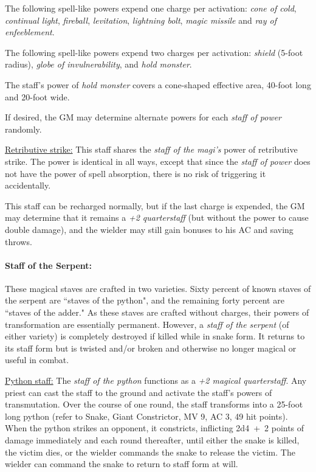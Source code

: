 \begin{multicols}{2}
The following spell-like powers expend one charge per activation: \textit{cone of cold}, \textit{continual light}, \textit{fireball}, \textit{levitation}, \textit{lightning bolt}, \textit{magic missile} and \textit{ray of enfeeblement}.

The following spell-like powers expend two charges per activation: \textit{shield} (5-foot radius), \textit{globe of invulnerability}, and \textit{hold monster}.

The staff's power of \textit{hold monster} covers a cone-shaped effective area, 40-foot long and 20-foot wide.

If desired, the GM may determine alternate powers for each \textit{staff of power} randomly.

\underline{Retributive strike:} This staff shares the \textit{staff of the magi's} power of retributive strike.  The power is identical in all ways, except that since the \textit{staff of power} does not have the power of spell absorption, there is no risk of triggering it accidentally.

This staff can be recharged normally, but if the last charge is expended, the GM may determine that it remains a \textit{+2 quarterstaff} (but without the power to cause double damage), and the wielder may still gain bonuses to his AC and saving throws.

\paragraph{Staff of the Serpent:} These magical staves are crafted in two varieties.  Sixty percent of known staves of the serpent are ``staves of the python", and the remaining forty percent are ``staves of the adder."  As these staves are crafted without charges, their powers of transformation are essentially permanent.  However, a \textit{staff of the serpent} (of either variety) is completely destroyed if killed while in snake form.  It returns to its staff form but is twisted and/or broken and otherwise no longer magical or useful in combat.

\underline{Python staff:} The \textit{staff of the python} functions as a \textit{+2 magical quarterstaff}.  Any priest can cast the staff to the ground and activate the staff's powers of transmutation.  Over the course of one round, the staff transforms into a 25-foot long python (refer to Snake, Giant Constrictor, MV 9, AC 3, 49 hit points).  When the python strikes an opponent, it constricts, inflicting 2d4~+~2 points of damage immediately and each round thereafter, until either the snake is killed, the victim dies, or the wielder commands the snake to release the victim.  The wielder can command the snake to return to staff form at will.  


\end{multicols}
